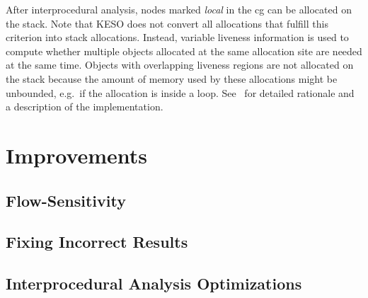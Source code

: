 			After interprocedural analysis, nodes marked \emph{local} in the \gls{cg} can be allocated on the stack. Note that
			KESO does not convert all allocations that fulfill this criterion into stack allocations. Instead, variable
			liveness information is used to compute whether multiple objects allocated at the same allocation site are needed
			at the same time. Objects with overlapping liveness regions are not allocated on the stack because the amount of
			memory used by these allocations might be unbounded, e.g.\ if the allocation is inside a loop.
			See~\cite[Sec.~3.3]{lang:12} for detailed rationale and a description of the implementation.

	\section{Improvements}
		\label{sec:ea:improvements}

		\subsection{Flow-Sensitivity}
			\label{subsec:ea:improvements:flow-sensitivity}

		\subsection{Fixing Incorrect Results}
			\label{subsec:ea:improvements:bug}

		\subsection{Interprocedural Analysis Optimizations}
			\label{subsec:ea:improvements:opt}

